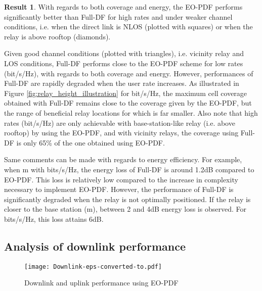 \documentclass[journal]{IEEEtran}
\theoremstyle{definition}
\newtheorem{result}{Result}
\begin{document}
\vspace*{-5pt}\begin{result}
With regards to both coverage and energy, the EO-PDF performs significantly better than Full-DF for high rates and under weaker channel conditions, i.e. when the direct link is NLOS (plotted with squares) or when the relay is above rooftop (diamonds). 
\end{result} \vspace*{-5pt} \noindent
Given good channel conditions (plotted with triangles), i.e. vicinity relay and LOS conditions, Full-DF performs close to the EO-PDF scheme for low rates (bit/s/Hz), with regards to both coverage and energy. However, performances of Full-DF are rapidly degraded when the user rate increases. As illustrated in Figure \ref{fig:relay_height_illustration} for bit/s/Hz, the maximum cell coverage obtained with Full-DF remains close to the coverage given by the EO-PDF, but the range of beneficial relay locations for which  is far smaller. Also note that high rates (bit/s/Hz) are only achievable with base-station-like relay (i.e. above rooftop) by using the EO-PDF, and with vicinity relays, the coverage using Full-DF is only 65\% of the one obtained using EO-PDF.

Same comments can be made with regards to energy efficiency.
For example, when m with bits/s/Hz, the energy loss of Full-DF is around 1.2dB compared to EO-PDF. This loss is relatively low compared to the increase in complexity necessary to implement EO-PDF. However, the performance of Full-DF is significantly degraded when the relay is not optimally positioned. If the relay is closer to the base station (m), between 2 and 4dB energy loss is observed. For bits/s/Hz, this loss attains 6dB. 





\subsection{Analysis of downlink performance}


\begin{figure}
	\centering
	\texttt{[image: Downlink-eps-converted-to.pdf]} 
	\caption{Downlink and uplink performance using EO-PDF}  
	\label{fig:downlink} 
\end{figure}
\end{document}
